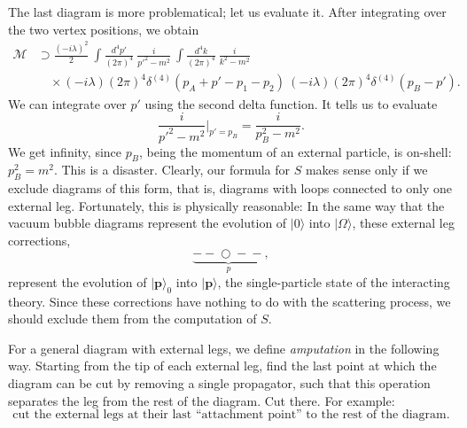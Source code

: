 The last diagram is more problematical; let us evaluate it.  After
integrating over the two vertex positions, we obtain
\begin{equation}
  \begin{aligned}
    \mathcal{M} &\supset \frac{(-i\lambda)^2}{2}\
      \int \frac{d^4p'}{(2\pi)^4}\ \frac{i}{p'^2-m^2}\
      \int \frac{d^4k}{(2\pi)^4}\ \frac{i}{k^2-m^2}\\
    &\quad \times (-i\lambda)(2\pi)^4\delta^{(4)}(p_A+p'-p_1-p_2)\
      (-i\lambda)(2\pi)^4\delta^{(4)}(p_B-p') .
  \end{aligned}
  \label{eq:4.102}
\end{equation}
We can integrate over $p'$ using the second delta function.  It tells us to
evaluate
\begin{equation}
  \frac{i}{p'^2-m^2}\Big|_{p'=p_B} = \frac{i}{p_B^2-m^2} .
\end{equation}
We get infinity, since $p_B$, being the momentum of an external particle, is
on-shell: $p_B^2 = m^2$.  This is a disaster.  Clearly, our formula for $S$
makes sense only if we exclude diagrams of this form, that is, diagrams with
loops connected to only one external leg.  Fortunately, this is physically
reasonable: In the same way that the vacuum bubble diagrams represent the
evolution of $|0\rangle$ into $|\Omega\rangle$, these external leg
corrections,
\begin{equation}
  \underbrace{-\!-\!\bigcirc\!-\!-}_{p},
\end{equation}
represent the evolution of $|\mathbf{p}\rangle_0$ into $|\mathbf{p}\rangle$,
the single-particle state of the interacting theory.  Since these corrections
have nothing to do with the scattering process, we should exclude them from
the computation of $S$.

For a general diagram with external legs, we define \emph{amputation} in the
following way.  Starting from the tip of each external leg, find the last
point at which the diagram can be cut by removing a single propagator, such
that this operation separates the leg from the rest of the diagram.  Cut
there.  For example:
\begin{equation}
  \text{cut the external legs at their last ``attachment point'' to the
    rest of the diagram} .
\end{equation}

